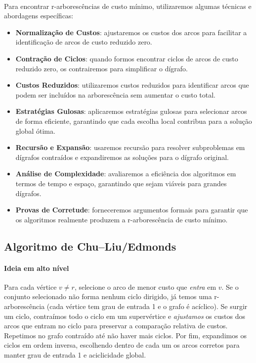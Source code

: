 \documentclass[12pt,a4paper]{article}
\begin{document}
\paragraph{}
Para encontrar r-arborescências de custo mínimo, utilizaremos algumas técnicas e abordagens específicas:
\begin{itemize}\setlength{\itemsep}{2pt}
    \item \textbf{Normalização de Custos}: ajustaremos os custos dos arcos para facilitar a identificação de arcos de custo reduzido zero.
    \item \textbf{Contração de Ciclos}: quando formos encontrar ciclos de arcos de custo reduzido zero, os contrairemos para simplificar o dígrafo.
    \item \textbf{Custos Reduzidos}: utilizaremos custos reduzidos para identificar arcos que podem ser incluídos na arborescência sem aumentar o custo total.
    \item \textbf{Estratégias Gulosas}: aplicaremos estratégias gulosas para selecionar arcos de forma eficiente, garantindo que cada escolha local contribua para a solução global ótima.
    \item \textbf{Recursão e Expansão}: usaremos recursão para resolver subproblemas em dígrafos contraídos e expandiremos as soluções para o dígrafo original.
    \item \textbf{Análise de Complexidade}: avaliaremos a eficiência dos algoritmos em termos de tempo e espaço, garantindo que sejam viáveis para grandes dígrafos.
    \item \textbf{Provas de Corretude}: forneceremos argumentos formais para garantir que os algoritmos realmente produzem a r-arborescência de custo mínimo.
\end{itemize}

\subsection{Algoritmo de Chu–Liu/Edmonds}




\paragraph{Ideia em alto nível}
Para cada vértice \(v\neq r\), selecione o arco de menor custo que \emph{entra} em \(v\). Se o conjunto selecionado não forma nenhum ciclo dirigido, já temos uma r-arborescência (cada vértice tem grau de entrada 1 e o grafo é acíclico). Se surgir um ciclo, contraímos todo o ciclo em um supervértice e \emph{ajustamos} os custos dos arcos que entram no ciclo para preservar a comparação relativa de custos. Repetimos no grafo contraído até não haver mais ciclos. Por fim, expandimos os ciclos em ordem inversa, escolhendo dentro de cada um os arcos corretos para manter grau de entrada 1 e aciclicidade global.
\end{document}
